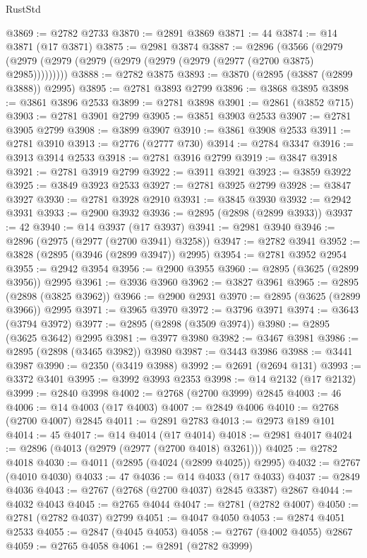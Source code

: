 \begin{lexlean}{RustStd}
\begin{coremodule}
@3869 := @2782 @2733
@3870 := @2891 @3869
@3871 := 44
@3874 := @14 @3871 (@17 @3871)
@3875 := @2981 @3874
@3887 := @2896
    (@3566 (@2979 (@2979 (@2979 (@2979 (@2979 (@2979 (@2979 (@2977 (@2700 @3875) @2985)))))))))
@3888 := @2782 @3875
@3893 := @3870 (@2895 (@3887 (@2899 @3888)) @2995)
@3895 := @2781 @3893 @2799
@3896 := @3868 @3895
@3898 := @3861 @3896 @2533
@3899 := @2781 @3898
@3901 := @2861 (@3852 @715)
@3903 := @2781 @3901 @2799
@3905 := @3851 @3903 @2533
@3907 := @2781 @3905 @2799
@3908 := @3899 @3907
@3910 := @3861 @3908 @2533
@3911 := @2781 @3910
@3913 := @2776 (@2777 @730)
@3914 := @2784 @3347
@3916 := @3913 @3914 @2533
@3918 := @2781 @3916 @2799
@3919 := @3847 @3918
@3921 := @2781 @3919 @2799
@3922 := @3911 @3921
@3923 := @3859 @3922
@3925 := @3849 @3923 @2533
@3927 := @2781 @3925 @2799
@3928 := @3847 @3927
@3930 := @2781 @3928 @2910
@3931 := @3845 @3930
@3932 := @2942 @3931
@3933 := @2900 @3932
@3936 := @2895 (@2898 (@2899 @3933))
@3937 := 42
@3940 := @14 @3937 (@17 @3937)
@3941 := @2981 @3940
@3946 := @2896 (@2975 (@2977 (@2700 @3941) @3258))
@3947 := @2782 @3941
@3952 := @3828 (@2895 (@3946 (@2899 @3947)) @2995)
@3954 := @2781 @3952 @2954
@3955 := @2942 @3954
@3956 := @2900 @3955
@3960 := @2895 (@3625 (@2899 @3956)) @2995
@3961 := @3936 @3960
@3962 := @3827 @3961
@3965 := @2895 (@2898 (@3825 @3962))
@3966 := @2900 @2931
@3970 := @2895 (@3625 (@2899 @3966)) @2995
@3971 := @3965 @3970
@3972 := @3796 @3971
@3974 := @3643 (@3794 @3972)
@3977 := @2895 (@2898 (@3509 @3974))
@3980 := @2895 (@3625 @3642) @2995
@3981 := @3977 @3980
@3982 := @3467 @3981
@3986 := @2895 (@2898 (@3465 @3982)) @3980
@3987 := @3443 @3986
@3988 := @3441 @3987
@3990 := @2350 (@3419 @3988)
@3992 := @2691 (@2694 @131)
@3993 := @3372 @3401
@3995 := @3992 @3993 @2353
@3998 := @14 @2132 (@17 @2132)
@3999 := @2840 @3998
@4002 := @2768 (@2700 @3999) @2845
@4003 := 46
@4006 := @14 @4003 (@17 @4003)
@4007 := @2849 @4006
@4010 := @2768 (@2700 @4007) @2845
@4011 := @2891 @2783
@4013 := @2973 @189 @101
@4014 := 45
@4017 := @14 @4014 (@17 @4014)
@4018 := @2981 @4017
@4024 := @2896 (@4013 (@2979 (@2977 (@2700 @4018) @3261)))
@4025 := @2782 @4018
@4030 := @4011 (@2895 (@4024 (@2899 @4025)) @2995)
@4032 := @2767 (@4010 @4030)
@4033 := 47
@4036 := @14 @4033 (@17 @4033)
@4037 := @2849 @4036
@4043 := @2767 (@2768 (@2700 @4037) @2845 @3387) @2867
@4044 := @4032 @4043
@4045 := @2765 @4044
@4047 := @2781 (@2782 @4007)
@4050 := @2781 (@2782 @4037) @2799
@4051 := @4047 @4050
@4053 := @2874 @4051 @2533
@4055 := @2847 (@4045 @4053)
@4058 := @2767 (@4002 @4055) @2867
@4059 := @2765 @4058
@4061 := @2891 (@2782 @3999)

\end{coremodule}
\end{lexlean}
